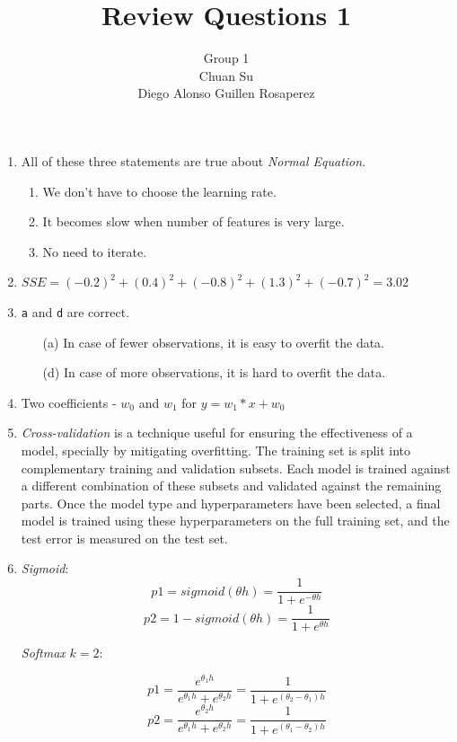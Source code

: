 \documentclass[12pt]{article}
\begin{document}
\title{Review Questions 1}
\author{Group 1 \\ Chuan Su \\ Diego Alonso Guillen Rosaperez}

\maketitle
\begin{enumerate}
	\item All of these three statements are true about \textit{Normal Equation}.
	\begin{enumerate}
\item We don’t have to choose the learning rate.
\item It becomes slow when number of features is very large.
\item No need to iterate.
	\end{enumerate}
\item $SSE = (-0.2)^2 + (0.4)^2 + (-0.8)^2 + (1.3)^2 + (-0.7)^2 = 3.02$
\item \texttt{a} and \texttt{d} are correct.
\begin{enumerate}
\item[(a)] In case of fewer observations, it is easy to overfit the data.
\item[(d)] In case of more observations, it is hard to overfit the data.
\end{enumerate}

\item Two coefficients - $w_0$ and $w_1$ for $y = w_1*x + w_0$
\item \textit{Cross-validation} is a technique useful for ensuring the effectiveness of a model, specially by mitigating overfitting. The training set is split into complementary training and validation subsets. Each model is trained against a different combination of these subsets and validated against the remaining parts. Once the model type and hyperparameters have been selected, a final model is trained using these hyperparameters on the full training set, and the test error is measured on the test set.

\item
\textit{Sigmoid}:
\[p1 = sigmoid(\theta h) = \frac{1}{1+e^{-\theta h}}\]
\[p2 = 1-sigmoid(\theta h) = \frac{1}{1+e^{\theta h}}\]

\textit{Softmax} $k=2$:

\[p1 = \frac{e^{\theta_1 h }}{e^{\theta_1 h} + e^{\theta_2 h } } = \frac{1}{1 + e^{(\theta_2-\theta_1) h}}\]
\[p2 = \frac{e^{\theta_2 h }}{e^{\theta_1 h} + e^{\theta_2 h } } = \frac{1}{1 + e^{(\theta_1-\theta_2)h}}\]


\end{enumerate}
\end{document}
